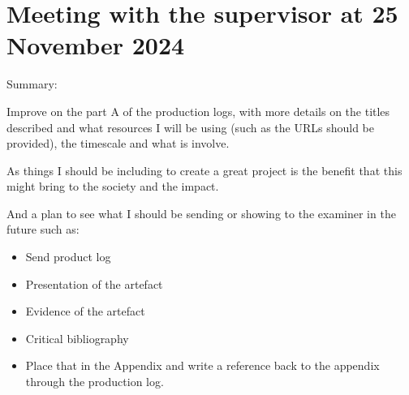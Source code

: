 \section{Meeting with the supervisor at 25 November 2024}
Summary: 

Improve on the part A of the production logs, with more details on the titles described and what resources I will be using (such as the URLs should be provided), the timescale and what is involve. 

As things I should be including to create a great project is the benefit that this might bring to the society and the impact.  

And a plan to see what I should be sending or showing to the examiner in the future such as:  

\begin{itemize}
    \item Send product log 
    \item Presentation of the artefact 
    \item Evidence of the artefact 
    \item Critical bibliography 
    \item Place that in the Appendix and write a reference back to the appendix through the production log.  
\end{itemize}
